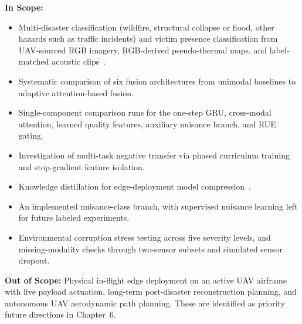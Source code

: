\documentclass[journal]{IEEEtran}
\begin{document}
\textbf{In Scope:}
\begin{itemize}
    \item Multi-disaster classification (wildfire, structural collapse or flood, other hazards such as traffic incidents) and victim presence classification from UAV-sourced RGB imagery, RGB-derived pseudo-thermal maps, and label-matched acoustic clips~\cite{erdelj2017help}.
    \item Systematic comparison of six fusion architectures from unimodal baselines to adaptive attention-based fusion.
    \item Single-component comparison runs for the one-step GRU, cross-modal attention, learned quality features, auxiliary nuisance branch, and RUE gating.
    \item Investigation of multi-task negative transfer via phased curriculum training and stop-gradient feature isolation.
    \item Knowledge distillation for edge-deployment model compression~\cite{hinton2015distilling}.
    \item An implemented nuisance-class branch, with supervised nuisance learning left for future labeled experiments.
    \item Environmental corruption stress testing across five severity levels, and missing-modality checks through two-sensor subsets and simulated sensor dropout.
\end{itemize}

\textbf{Out of Scope:} Physical in-flight edge deployment on an active UAV airframe with live payload actuation, long-term post-disaster reconstruction planning, and autonomous UAV aerodynamic path planning. These are identified as priority future directions in Chapter~6.
\end{document}
